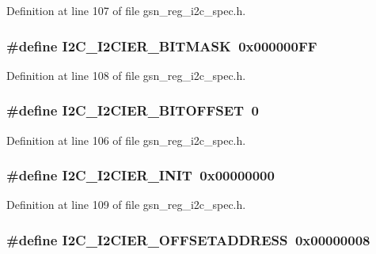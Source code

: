 Definition at line 107 of file gsn\_\-reg\_\-i2c\_\-spec.h.

\hypertarget{a00558_a85aee0be9ab351c1c4b7132f709fc346}{
\subsubsection[{I2C\_\-I2CIER\_\-BITMASK}]{\setlength{\rightskip}{0pt plus 5cm}\#define I2C\_\-I2CIER\_\-BITMASK~0x000000FF}}
\label{a00558_a85aee0be9ab351c1c4b7132f709fc346}


Definition at line 108 of file gsn\_\-reg\_\-i2c\_\-spec.h.

\hypertarget{a00558_a96de71e67c22007f3f7396fbdd63275b}{
\subsubsection[{I2C\_\-I2CIER\_\-BITOFFSET}]{\setlength{\rightskip}{0pt plus 5cm}\#define I2C\_\-I2CIER\_\-BITOFFSET~0}}
\label{a00558_a96de71e67c22007f3f7396fbdd63275b}


Definition at line 106 of file gsn\_\-reg\_\-i2c\_\-spec.h.

\hypertarget{a00558_a1c937f500862380674ae1cce4ec04917}{
\subsubsection[{I2C\_\-I2CIER\_\-INIT}]{\setlength{\rightskip}{0pt plus 5cm}\#define I2C\_\-I2CIER\_\-INIT~0x00000000}}
\label{a00558_a1c937f500862380674ae1cce4ec04917}


Definition at line 109 of file gsn\_\-reg\_\-i2c\_\-spec.h.

\hypertarget{a00558_ad352c904e03a40b2a8af5c8ef71272d9}{
\subsubsection[{I2C\_\-I2CIER\_\-OFFSETADDRESS}]{\setlength{\rightskip}{0pt plus 5cm}\#define I2C\_\-I2CIER\_\-OFFSETADDRESS~0x00000008}}
\label{a00558_ad352c904e03a40b2a8af5c8ef71272d9}


